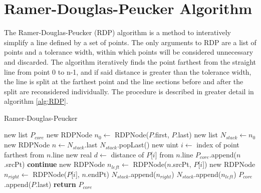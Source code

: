 \section{Ramer-Douglas-Peucker Algorithm}
The Ramer-Douglas-Peucker (RDP) algorithm is a method to interatively simplify a line defined by a set of points.
The only arguments to RDP are a list of points and a tolerance width, within which points will be considered unnecessary and discarded.
The algorithm iteratively finds the point farthest from the straight line from point 0 to n-1, and if said distance is greater than the tolerance width, the line is split at the farthest point and the line sections before and after the split are reconsidered individually.
The procedure is described in greater detail in algorithm \ref{alg:RDP}.

\begin{algorithm}[H]
\caption{Ramer-Douglas-Peucker}\label{alg:RDP}
\begin{algorithmic}[1]
	\State new list $P_{core}$
	\State new RDPNode $n_0 \leftarrow$ RDPNode($P$.first, $P$.last)
	\State new list $N_{stack} \leftarrow n_0$
		\State new RDPNode $n \leftarrow N_{stack}$.last
		\State $N_{stack}$.popLast()
		\State new uint $i \leftarrow$ index of point farthest from $n$.line
		\State new real $d \leftarrow$ distance of $P$[$i$] from $n$.line
		 
			\State $P_{core}$.append($n$.srcPt) 
			\State \textbf{continue}
		\EndIf
		\State new RDPNode $n_{left} \leftarrow$ RDPNode($n$.srcPt, $P$[$i$])
		\State new RDPNode $n_{right} \leftarrow$ RDPNode($P$[$i$], $n$.endPt)
		\State $N_{stack}$.append($n_{right}$)
		\State $N_{stack}$.append($n_{left}$)
	\EndWhile
	\State $P_{core}$.append($P$.last)
	\State \textbf{return} $P_{core}$
\EndFunction
\end{algorithmic}
\end{algorithm}

